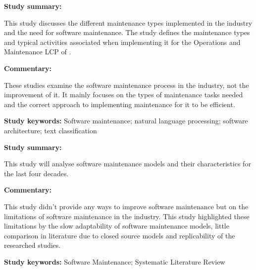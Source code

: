 \begin{tcolorbox}[colback=gray!5!white, colframe=deepblue!80!black, title=Supporting Software Architecture Maintenance by Providing Task-specific Recommendations \cite{Galster2019}]
	\begin{minipage}[t]{0.25\textwidth}
		\textbf{Study summary:}
	\end{minipage}
	\hfill
	\begin{minipage}[t]{0.65\textwidth}
		This study discusses the different maintenance types implemented in the industry and the need for software maintenance. The study defines the maintenance types and typical activities associated when implementing it for the Operations and Maintenance LCP of .
	\end{minipage}

	\vspace{0.75em} 

	\begin{minipage}[t]{0.25\textwidth}
		\textbf{Commentary:}
	\end{minipage}
	\hfill
	\begin{minipage}[t]{0.65\textwidth}
		These studies examine the software maintenance process in the industry, not the improvement of it. It mainly focuses on the types of maintenance tasks needed and the correct approach to implementing maintenance for it to be efficient.
	\end{minipage}
	\tcblower
	\textbf{Study keywords:} Software maintenance; natural language processing; software architecture; text classification
\end{tcolorbox}

\clearpage

\begin{tcolorbox}[colback=gray!5!white, colframe=deepblue!80!black, title=Analyzing Forty Years of Software Maintenance Models\cite{Lenarduzzi2017}]
	\begin{minipage}[t]{0.25\textwidth}
		\textbf{Study summary:}
	\end{minipage}
	\hfill
	\begin{minipage}[t]{0.65\textwidth}
		This study will analyse software maintenance models and their characteristics for the last four decades.
	\end{minipage}

	\vspace{0.75em} 

	\begin{minipage}[t]{0.25\textwidth}
		\textbf{Commentary:}
	\end{minipage}
	\hfill
	\begin{minipage}[t]{0.65\textwidth}
		This study didn't provide any ways to improve software maintenance but on the limitations of software maintenance in the industry. This study highlighted these limitations by the slow adaptability of software maintenance models, little comparison in literature due to closed source models and replicability of the researched studies.
	\end{minipage}
	\tcblower
	\textbf{Study keywords:} Software Maintenance; Systematic Literature Review
\end{tcolorbox}

